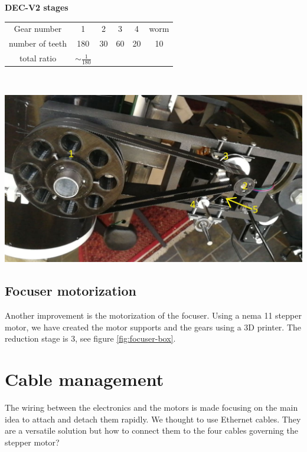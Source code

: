 \documentclass{article}
\begin{document}
\begin{multicols}{2}
        \begin{minipage}
            {0.5\textwidth}
            \centering
            \textbf{DEC-V2 stages}\\
            \begin{tabular}{cccccc}
                \hline
                Gear number & 1 & 2 & 3 & 4 & worm\\
                number of teeth & 180 & 30 & 60 & 20 & 10\\
                \hline
                total ratio & \(\sim \frac{1}{180}\) &&&
            \end{tabular}
            \label{tab:DEC_gear_spec_v2}
        \end{minipage}
        \\
        \begin{minipage}
            {0.5\textwidth}
            \centering
            \includegraphics[scale=.6]{DEC-v3.jpg}
            \label{fig:DEC_mechanism_v3}
        \end{minipage}

        \subsection{Focuser motorization}
        Another improvement is the motorization of the focuser.
        Using a nema 11 stepper motor, we have created the motor supports and the gears using a 3D printer.
        The reduction stage is 3, see figure \ref{fig:focuser-box}.


        \section{Cable management}
        The wiring between the electronics and the motors is made focusing on the main idea to attach and detach them rapidly.
        We thought to use Ethernet cables.
        They are a versatile solution but how to connect them to the four cables governing the stepper motor?


\end{multicols}
\end{document}
